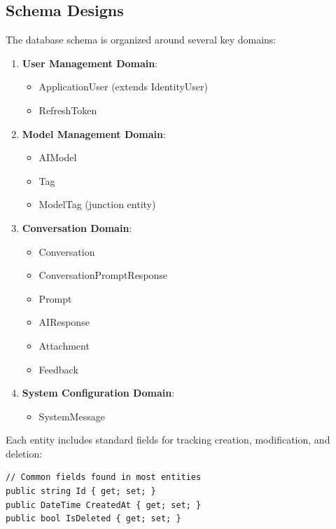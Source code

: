 \subsection{Schema Designs}

The database schema is organized around several key domains:

\begin{enumerate}
   \item \textbf{User Management Domain}:
   \begin{itemize}
      \item ApplicationUser (extends IdentityUser)
      \item RefreshToken
   \end{itemize}

   \item \textbf{Model Management Domain}:
   \begin{itemize}
      \item AIModel
      \item Tag
      \item ModelTag (junction entity)
   \end{itemize}

   \item \textbf{Conversation Domain}:
   \begin{itemize}
      \item Conversation
      \item ConversationPromptResponse
      \item Prompt
      \item AIResponse
      \item Attachment
      \item Feedback
   \end{itemize}

   \item \textbf{System Configuration Domain}:
   \begin{itemize}
      \item SystemMessage
   \end{itemize}
\end{enumerate}

Each entity includes standard fields for tracking creation, modification, and deletion:

\begin{verbatim}
// Common fields found in most entities
public string Id { get; set; }
public DateTime CreatedAt { get; set; }
public bool IsDeleted { get; set; }
\end{verbatim}

